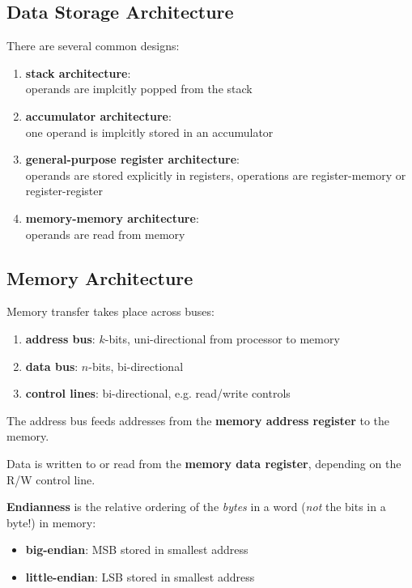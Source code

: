 \subsection{Data Storage Architecture}
There are several common designs:

\begin{enumerate}[itemsep=0.5em]
    \item \textbf{stack architecture}: \\ operands are implcitly popped from the stack
    \item \textbf{accumulator architecture}: \\ one operand is implcitly stored in an accumulator
    \item \textbf{general-purpose register architecture}: \\ operands are stored explicitly in registers, operations are register-memory or register-register
    \item \textbf{memory-memory architecture}: \\ operands are read from memory
\end{enumerate}

\subsection{Memory Architecture}
Memory transfer takes place across buses:

\begin{enumerate}
    \item \textbf{address bus}: $k$-bits, uni-directional from processor to memory
    \item \textbf{data bus}: $n$-bits, bi-directional
    \item \textbf{control lines}: bi-directional, e.g. read/write controls
\end{enumerate}

The address bus feeds addresses from the \textbf{memory address register} to the memory.

Data is written to or read from the \textbf{memory data register}, depending on the R/W control line.

\textbf{Endianness} is the relative ordering of the \textit{bytes} in a word (\textit{not} the bits in a byte!) in memory:

\begin{itemize}
    \item \textbf{big-endian}: MSB stored in smallest address
    \item \textbf{little-endian}: LSB stored in smallest address
\end{itemize}


